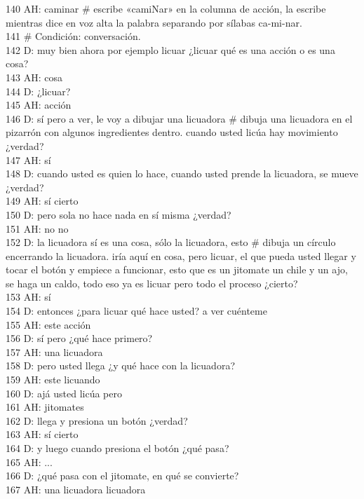140 AH: caminar \# escribe «camiNar» en la columna de acción, la escribe mientras dice en voz alta la palabra separando por sílabas ca-mi-nar.\\
141 \# Condición: conversación.\\
142 D: muy bien ahora por ejemplo licuar ¿licuar qué es una acción o es una cosa?\\
143 AH: cosa\\
144 D: ¿licuar?\\
145 AH: acción\\
146 D: sí pero a ver, le voy a dibujar una licuadora \# dibuja una licuadora en el pizarrón con algunos ingredientes dentro. cuando usted licúa hay movimiento ¿verdad?\\
147 AH: sí\\
148 D: cuando usted es quien lo hace, cuando usted prende la licuadora, se mueve ¿verdad?\\
149 AH: sí cierto\\
150 D: pero sola no hace nada en sí misma ¿verdad?\\
151 AH: no no\\
152 D: la licuadora sí es una cosa, sólo la licuadora, esto \# dibuja un círculo encerrando la licuadora. iría aquí en cosa, pero licuar, el que pueda usted llegar y tocar el botón y empiece a funcionar, esto que es un jitomate un chile y un ajo, se haga un caldo, todo eso ya es licuar pero todo el proceso ¿cierto?\\
153 AH: sí\\
154 D: entonces ¿para licuar qué hace usted? a ver cuénteme\\
155 AH: este acción\\
156 D: sí pero ¿qué hace primero?\\
157 AH: una licuadora\\
158 D: pero usted llega ¿y qué hace con la licuadora?\\
159 AH: este licuando\\
160 D: ajá usted licúa pero\\
161 AH: jitomates\\
162 D: llega y presiona un botón ¿verdad?\\
163 AH: sí cierto\\
164 D: y luego cuando presiona el botón ¿qué pasa?\\
165 AH: ...\\
166 D: ¿qué pasa con el jitomate, en qué se convierte?\\
167 AH: una licuadora licuadora\\
